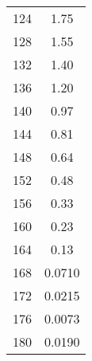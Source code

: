 \begin{table}
\begin{tabular}[t]{S S}
        124 & 1.75  \\
        128 & 1.55  \\
        132 & 1.40  \\
        136 & 1.20  \\
        140 & 0.97  \\
        144 & 0.81  \\
        148 & 0.64  \\
        152 & 0.48  \\
        156 & 0.33  \\
        160 & 0.23  \\
        164 & 0.13  \\
        168 & 0.0710    \\
        172 & 0.0215    \\
        176 & 0.0073    \\
        180 & 0.0190    \\

        \bottomrule

    \end{tabular}
\end{table}


